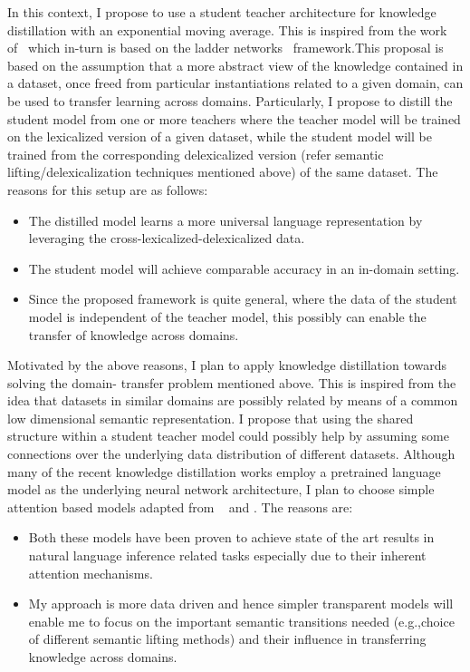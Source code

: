 \documentclass{article}
\begin{document}
In this context, I propose to use a student teacher architecture for knowledge distillation with an exponential moving average. This is inspired from the work of~\citep*{tarvainen2017mean} which in-turn is based on the ladder networks~\citep*{valpola2015neural,rasmus2015semi} framework.This proposal is based on the assumption that a more abstract view of the knowledge contained in a dataset, once freed from particular instantiations related to a given domain, can be used to transfer learning across domains. Particularly, I propose to distill the student model from one or more teachers where the teacher model will be trained on the lexicalized version of a given dataset, while the student model will be trained from the corresponding delexicalized version (refer semantic lifting/delexicalization techniques mentioned above) of the same dataset. The reasons for this setup are as follows:





\begin{itemize}
  \item The distilled model learns a more universal language representation by leveraging the cross-lexicalized-delexicalized data.
  \item The student model will achieve comparable accuracy in an in-domain setting.
  \item Since the proposed framework is quite general, where the data of the student model is independent of the teacher model, this possibly can enable the transfer of knowledge across domains.
\end{itemize}

Motivated by the above reasons, I plan to apply knowledge distillation towards solving the domain- transfer problem mentioned above. This is inspired from the idea that datasets in similar domains are possibly related by means of a common low dimensional semantic representation. I propose that using the shared structure within a student teacher model could possibly help by assuming some connections over the underlying data distribution of different datasets. Although many of the recent knowledge distillation works \citep*{jiao2019tinybert,tang2019distilling,zhao2019extreme}  employ a  pretrained language model as the underlying neural network architecture, I plan to choose simple attention based models adapted from ~\citep*{parikh2016decomposable} and \citep*{chen2016enhanced}. The reasons are:

\begin{itemize}
  \item Both these models have been proven to achieve state of the art results in natural language inference related tasks especially due to their inherent attention mechanisms.
  \item My approach is more data driven and hence simpler transparent models will enable me to focus on the important semantic transitions needed (e.g.,choice of different semantic lifting methods) and their influence in transferring knowledge across domains.
 \end{itemize}
\end{document}
